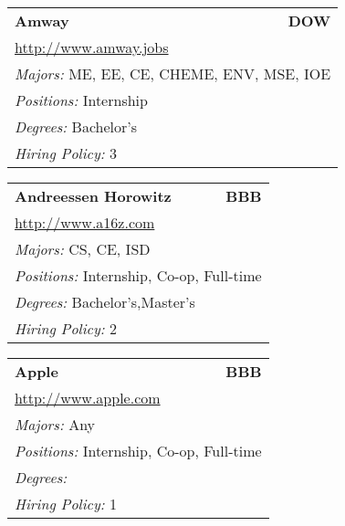 \documentclass[twoside]{article}
\begin{document}
\begin{center}
\begin{multicols}{3}
\begin{FlushLeft}
\begin{minipage}{.9\columnwidth}
\end{minipage}
 
\begin{minipage}{.9\columnwidth}\begin{tabularx}{.95\columnwidth}{Xr}
                 {\Large\bf Amway} & {\Large\bf DOW}\\
    \multicolumn{2}{p{.95\columnwidth}}{\url{http://www.amway.jobs}}\\
    \multicolumn{2}{p{.95\columnwidth}}{\emph{Majors:} ME, EE, CE, CHEME, ENV, MSE, IOE}\\
    \multicolumn{2}{p{.95\columnwidth}}{\emph{Positions:} Internship}\\
    \multicolumn{2}{p{.95\columnwidth}}{\emph{Degrees:} Bachelor's}\\
    \multicolumn{2}{p{.95\columnwidth}}{\emph{Hiring Policy:} 3}\\
    \end{tabularx}
    
\end{minipage}
 
\begin{minipage}{.9\columnwidth}\begin{tabularx}{.95\columnwidth}{Xr}
                 {\Large\bf Andreessen Horowitz} & {\Large\bf BBB}\\
    \multicolumn{2}{p{.95\columnwidth}}{\url{http://www.a16z.com}}\\
    \multicolumn{2}{p{.95\columnwidth}}{\emph{Majors:} CS, CE, ISD}\\
    \multicolumn{2}{p{.95\columnwidth}}{\emph{Positions:} Internship, Co-op, Full-time}\\
    \multicolumn{2}{p{.95\columnwidth}}{\emph{Degrees:} Bachelor's,Master's}\\
    \multicolumn{2}{p{.95\columnwidth}}{\emph{Hiring Policy:} 2}\\
    \end{tabularx}
    
\end{minipage}
 
\begin{minipage}{.9\columnwidth}\begin{tabularx}{.95\columnwidth}{Xr}
                 {\Large\bf Apple} & {\Large\bf BBB}\\
    \multicolumn{2}{p{.95\columnwidth}}{\url{http://www.apple.com}}\\
    \multicolumn{2}{p{.95\columnwidth}}{\emph{Majors:} Any}\\
    \multicolumn{2}{p{.95\columnwidth}}{\emph{Positions:} Internship, Co-op, Full-time}\\
    \multicolumn{2}{p{.95\columnwidth}}{\emph{Degrees:} }\\
    \multicolumn{2}{p{.95\columnwidth}}{\emph{Hiring Policy:} 1}\\
    \end{tabularx}
    

\end{minipage}
\end{FlushLeft}
\end{multicols}
\end{center}
\end{document}
